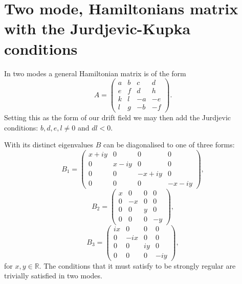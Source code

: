 \section{Two mode, Hamiltonians matrix with the Jurdjevic-Kupka conditions}
In two modes a general Hamiltonian matrix is of the form
\begin{equation}
A = \begin{pmatrix} a & b & c & d \\ e & f & d & h \\k & l & -a & -e \\l & g & -b & -f \end{pmatrix}.
\end{equation}
Setting this as the form of our drift field we may then add the Jurdjevic conditions: $b,d,e,l \neq 0$ and $dl < 0$.

With its distinct eigenvalues $B$ can be diagonalised to one of three forms:
\begin{equation}
B_1 = \begin{pmatrix} x+iy & 0 & 0 & 0 \\ 0 & x-iy & 0 & 0 \\0 & 0 & -x+iy & 0 \\0 & 0 & 0 & -x-iy \end{pmatrix},
\end{equation}
\begin{equation}
B_2 = \begin{pmatrix} x & 0 & 0 & 0 \\ 0 & -x & 0 & 0 \\0 & 0 & y & 0 \\0 & 0 & 0 & -y \end{pmatrix},
\end{equation}
\begin{equation}
B_3 = \begin{pmatrix} ix & 0 & 0 & 0 \\ 0 & -ix & 0 & 0 \\0 & 0 & iy & 0 \\0 & 0 & 0 & -iy \end{pmatrix},
\end{equation}
for $x,y \in \mathbb{R}$.
The conditions that it must satisfy to be strongly regular are trivially satisfied in two modes.

